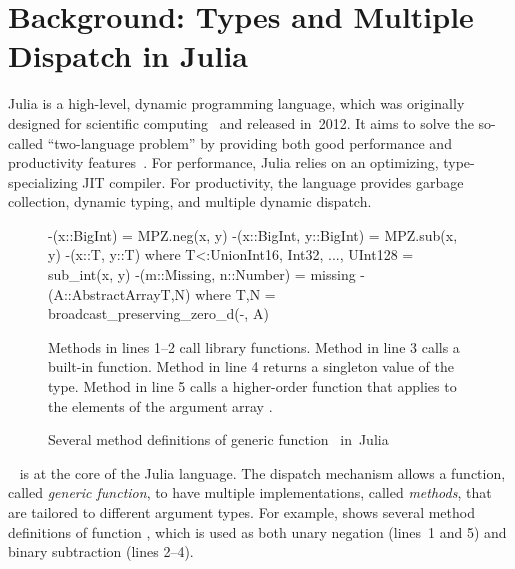 \chapter{Background: Types and Multiple Dispatch in Julia}%
\label{chap:background}


Julia is a high-level, dynamic programming language, which was originally
designed for scientific computing~\cite{bib:bezanson:julia-fresh:2017}
and released in~2012.
It aims to solve the so-called ``two-language problem''
by providing both good performance and productivity
features~\cite{bib:bezanson:julia-dyn-perf:oopsla:2018}.
For performance, Julia relies on an optimizing, type-specializing JIT compiler.
For productivity, the language provides garbage collection, dynamic typing, and
multiple dynamic dispatch.

\begin{figure}[t]
\begin{julia}
-(x::BigInt) = MPZ.neg(x, y)
-(x::BigInt, y::BigInt) = MPZ.sub(x, y)
-(x::T, y::T) where T<:Union{Int16, Int32, ..., UInt128} = sub_int(x, y)
-(m::Missing, n::Number) = missing
-(A::AbstractArray{T,N}) where {T,N} = broadcast_preserving_zero_d(-, A)
\end{julia}
\caption{Several method definitions of generic function~\cjl{(-)} in~Julia
}\label{fig:code:subtraction}
\begin{tablenotes}[para]
\small
Methods in lines 1--2 call library functions.
Method in line 3 calls a built-in function.
Method in line 4 returns a singleton value  of the  type.
Method in line 5 calls a higher-order function that applies \cjl{(-)} to the
elements of the argument array .
\end{tablenotes}
\end{figure}

~\cite{bib:bobrow:common-loops:1986,%
bib:chambers:multi-cecil:1992} is at the core of the Julia language.
The dispatch mechanism allows a function, called \emph{generic
function}, to have multiple implementations, called \emph{methods}, that are
tailored to different argument types. For example, 
shows several method definitions of function \cjl{(-)},
which is used as both unary negation (lines~1 and 5)
and binary subtraction (lines 2--4).

